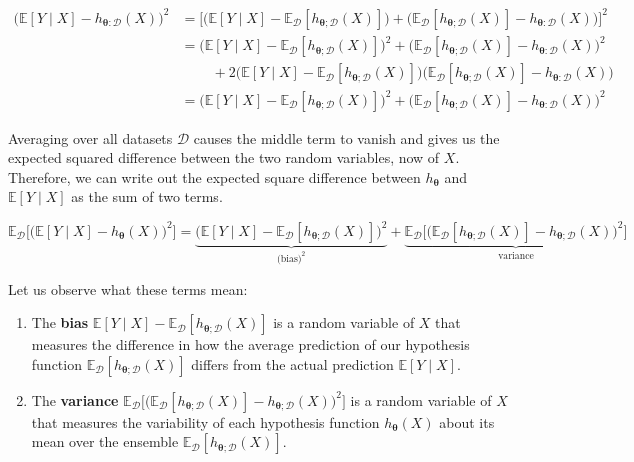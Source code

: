 \documentclass{article}
\begin{document}
    \begin{align*}
      \big(\mathbb{E}[Y \mid X] - h_{{\boldsymbol{\theta}}:\mathcal{D}} (X) \big)^2 & =  \big[ \big( \mathbb{E}[Y \mid X] - \mathbb{E}_\mathcal{D} [h_{{\boldsymbol{\theta}}; \mathcal{D}} (X)] \big) + \big( \mathbb{E}_\mathcal{D} [h_{{\boldsymbol{\theta}}; \mathcal{D}} (X)] - h_{{\boldsymbol{\theta}}:\mathcal{D}} (X) \big) \big]^2 \\
      & = \big( \mathbb{E}[Y \mid X] - \mathbb{E}_\mathcal{D} [h_{{\boldsymbol{\theta}}; \mathcal{D}} (X)] \big)^2 + \big( \mathbb{E}_\mathcal{D} [h_{{\boldsymbol{\theta}}; \mathcal{D}} (X)] - h_{{\boldsymbol{\theta}}:\mathcal{D}} (X) \big)^2 \\
      & \;\;\;\;\;\;\;\; + 2 \big( \mathbb{E}[Y \mid X] - \mathbb{E}_\mathcal{D} [h_{{\boldsymbol{\theta}}; \mathcal{D}} (X)] \big) \big( \mathbb{E}_\mathcal{D} [h_{{\boldsymbol{\theta}}; \mathcal{D}} (X)] - h_{{\boldsymbol{\theta}}:\mathcal{D}} (X) \big) \\
      & = \big( \mathbb{E}[Y \mid X] - \mathbb{E}_\mathcal{D} [h_{{\boldsymbol{\theta}}; \mathcal{D}} (X)] \big)^2 + \big( \mathbb{E}_\mathcal{D} [h_{{\boldsymbol{\theta}}; \mathcal{D}} (X)] - h_{{\boldsymbol{\theta}}:\mathcal{D}} (X) \big)^2 
    \end{align*}

    Averaging over all datasets $\mathcal{D}$ causes the middle term to vanish and gives us the expected squared difference between the two random variables, now of $X$. Therefore, we can write out the expected square difference between $h_{\boldsymbol{\theta}}$ and $\mathbb{E}[Y\mid X]$ as the sum of two terms. 

      \[\mathbb{E}_\mathcal{D} \big[ \big(\mathbb{E}[Y \mid X] - h_{\boldsymbol{\theta}}(X) \big)^2 \big] = \underbrace{\big( \mathbb{E}[Y \mid X] - \mathbb{E}_\mathcal{D} [h_{{\boldsymbol{\theta}}; \mathcal{D}} (X)] \big)^2}_{\text{(bias)}^2} + \underbrace{ \mathbb{E}_\mathcal{D} \big[ \big( \mathbb{E}_\mathcal{D} [h_{{\boldsymbol{\theta}}; \mathcal{D}} (X)] - h_{\boldsymbol{\theta}; \mathcal{D}}(X) \big)^2 \big]}_{\text{variance}}\]

    Let us observe what these terms mean: 

    \begin{enumerate}
      \item The \textbf{bias} $\mathbb{E}[Y \mid X] - \mathbb{E}_\mathcal{D} [h_{{\boldsymbol{\theta}}; \mathcal{D}} (X)]$ is a random variable of $X$ that measures the difference in how the average prediction of our hypothesis function $\mathbb{E}_\mathcal{D} [h_{{\boldsymbol{\theta}}; \mathcal{D}} (X)]$ differs from the actual prediction $\mathbb{E}[Y \mid X]$. 

      \item The \textbf{variance} $\mathbb{E}_\mathcal{D} \big[ \big( \mathbb{E}_\mathcal{D} [h_{{\boldsymbol{\theta}}; \mathcal{D}} (X)] - h_{{\boldsymbol{\theta}}; \mathcal{D}} (X) \big)^2 \big]$ is a random variable of $X$ that measures the variability of each hypothesis function $h_{\boldsymbol{\theta}}(X)$ about its mean over the ensemble $\mathbb{E}_\mathcal{D} [h_{{\boldsymbol{\theta}}; \mathcal{D}} (X)]$. 
    \end{enumerate}
\end{document}
